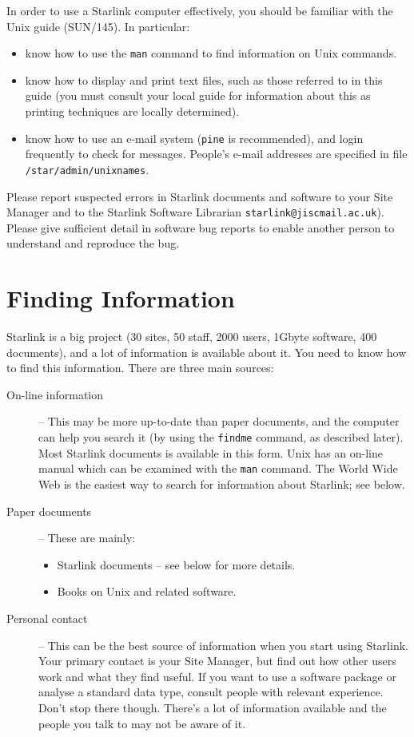 \documentclass[twoside]{article}
\newcommand{\xref}[3]{#1}
\begin{document}
In order to use a Starlink computer effectively, you should be familiar
with the Unix guide
(\xref{SUN/145}{sun145}{}).
In particular:

\begin{itemize}
\item know how to use the {\tt man} command to find information on Unix
commands.
\item know how to display and print text files, such as those referred to in
this guide (you must consult your local guide for information about this
as printing techniques are locally determined).
\item know how to use an e-mail system ({\tt pine} is recommended), and login
frequently to check for messages.
People's e-mail addresses are specified in file {\tt /star/admin/unixnames}.
\end{itemize}

Please report suspected errors in Starlink documents and software to your Site
Manager and to the Starlink Software Librarian {\tt starlink@jiscmail.ac.uk}).
Please give sufficient detail in software bug reports to enable another person
to understand and reproduce the bug.

\newpage

\section{Finding Information}

Starlink is a big project (30 sites, 50 staff, 2000 users, 1Gbyte software,
400 documents), and a lot of information is available about it.
You need to know how to find this information.
There are three main sources:

\begin{description}

\item [On-line information] --
This may be more up-to-date than paper documents, and the computer can help
you search it (by using the {\tt findme} command, as described later).
Most Starlink documents is available in this form.
Unix has an on-line manual which can be examined with the {\tt man} command.
The World Wide Web is the easiest way to search for information about
Starlink; see below.

\item [Paper documents] --
These are mainly:
\begin{itemize}
\item Starlink documents -- see below for more details.
\item Books on Unix and related software.
\end{itemize}

\item [Personal contact] --
This can be the best source of information when you start using Starlink.
Your primary contact is your Site Manager, but find out how other users work
and what they find useful.
If you want to use a software package or analyse a standard data type,
consult people with relevant experience.
Don't stop there though.
There's a lot of information available and the people you talk to may
not be aware of it.
\end{description}
\end{document}
